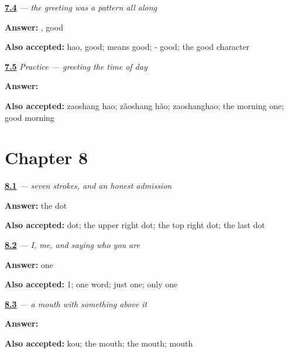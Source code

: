 \noindent\begin{minipage}[t]{\linewidth}
\raggedright
\hyperlink{review-ZH-C07-zaoshanghao-frame}{\textbf{7.4}} \emph{ — the greeting was a pattern all along}\par
\small \textbf{Answer:} , good\par
\footnotesize \textbf{Also accepted:} hao, good;  means good;  - good; the good character
\end{minipage}\par\medskip

\noindent\begin{minipage}[t]{\linewidth}
\raggedright
\hyperlink{review-ZH-C07-practice-choice}{\textbf{7.5}} \emph{Practice — greeting the time of day}\par
\small \textbf{Answer:} \par
\footnotesize \textbf{Also accepted:} zaoshang hao; zǎoshang hǎo; zaoshanghao; the morning one; good morning
\end{minipage}\par\medskip

\section*{Chapter 8}

\noindent\begin{minipage}[t]{\linewidth}
\raggedright
\hyperlink{review-ZH-W08-wo-dot}{\textbf{8.1}} \emph{ — seven strokes, and an honest admission}\par
\small \textbf{Answer:} the dot\par
\footnotesize \textbf{Also accepted:} dot; the upper right dot; the top right dot; the last dot
\end{minipage}\par\medskip

\noindent\begin{minipage}[t]{\linewidth}
\raggedright
\hyperlink{review-ZH-C08-wo-both}{\textbf{8.2}} \emph{ — I, me, and saying who you are}\par
\small \textbf{Answer:} one\par
\footnotesize \textbf{Also accepted:} 1; one word; just one; only one
\end{minipage}\par\medskip

\noindent\begin{minipage}[t]{\linewidth}
\raggedright
\hyperlink{review-ZH-W08-ming-lower}{\textbf{8.3}} \emph{ — a mouth with something above it}\par
\small \textbf{Answer:} \par
\footnotesize \textbf{Also accepted:} kou; the mouth;  the mouth; mouth
\end{minipage}\par\medskip

